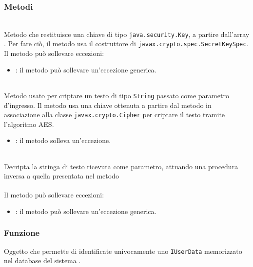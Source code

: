 \subsubsection*{Metodi}
\begin{description}
	\item{}\\
	Metodo che restituisce una chiave di tipo \texttt{java.security.Key}, a partire dall'array . Per fare ciò, il metodo usa il costruttore di \texttt{javax.crypto.spec.SecretKeySpec}.
	Il metodo può sollevare eccezioni:
	\begin{itemize}
		\item {}: il metodo può sollevare un'eccezione generica.
	\end{itemize}
	\item{}\\
	Metodo usato per criptare un testo di tipo \texttt{String} passato come parametro d'ingresso. Il metodo usa una chiave ottenuta a partire dal metodo  in associazione alla classe \texttt{javax.crypto.Cipher} per criptare il testo tramite l'algoritmo AES.
	\begin{itemize}
		\item {}: il metodo solleva un'eccezione.
	\end{itemize}
	\item{}\\
	Decripta la stringa di testo ricevuta come parametro, attuando una procedura inversa a quella presentata nel metodo \\\\
	Il metodo può sollevare eccezioni:
	\begin{itemize}
		\item {}: il metodo può sollevare un'eccezione generica.
	\end{itemize}
\end{description}


\subsubsection*{Funzione}
Oggetto che permette di identificate univocamente uno \texttt{IUserData} memorizzato nel database del sistema \caName.

